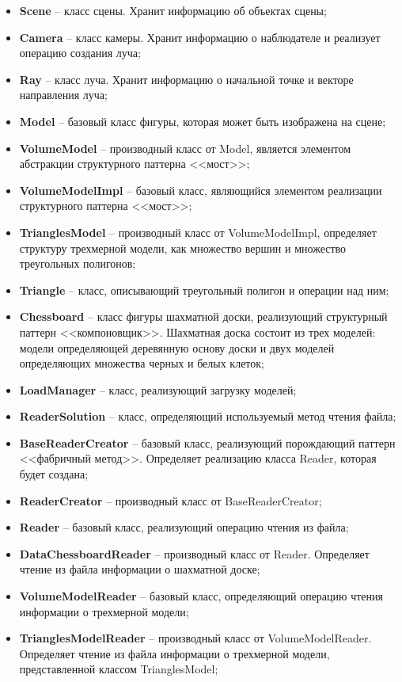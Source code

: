 \begin{itemize}
	\item \textbf{Scene} -- класс сцены. Хранит информацию об объектах сцены;
	\item \textbf{Camera} -- класс камеры. Хранит информацию о наблюдателе и реализует операцию создания луча;
	\item \textbf{Ray} -- класс луча. Хранит информацию о начальной точке и векторе направления луча;
	\item \textbf{Model} -- базовый класс фигуры, которая может быть изображена на сцене;
	\item \textbf{VolumeModel} -- производный класс от Model, является элементом абстракции структурного паттерна <<мост>>;
	\item \textbf{VolumeModelImpl} -- базовый класс, являющийся элементом реализации структурного паттерна <<мост>>;
	\item \textbf{TrianglesModel} -- производный класс от VolumeModelImpl, определяет структуру трехмерной модели, как множество вершин и множество треугольных полигонов;
	\item \textbf{Triangle} -- класс, описывающий треугольный полигон и операции над ним;
	\item \textbf{Chessboard} -- класс фигуры шахматной доски, реализующий структурный паттерн <<компоновщик>>. Шахматная доска состоит из трех моделей: модели определяющей деревянную основу доски и двух моделей определяющих множества черных и белых клеток;
	\item \textbf{LoadManager} -- класс, реализующий загрузку моделей;
	\item \textbf{ReaderSolution} -- класс, определяющий используемый метод чтения файла;
	\item \textbf{BaseReaderCreator} -- базовый класс, реализующий порождающий паттерн <<фабричный метод>>. Определяет реализацию класса Reader, которая будет создана;
	\item \textbf{ReaderCreator} -- производный класс от BaseReaderCreator;
	\item \textbf{Reader} -- базовый класс, реализующий операцию чтения из файла;
	\item \textbf{DataChessboardReader} -- производный класс от Reader. Определяет чтение из файла информации о шахматной доске;
	\item \textbf{VolumeModelReader} -- базовый класс, определяющий операцию чтения информации о трехмерной модели;
	\item \textbf{TrianglesModelReader} -- производный класс от VolumeModelReader. Определяет чтение из файла информации о трехмерной модели, представленной классом TrianglesModel;

\end{itemize}
